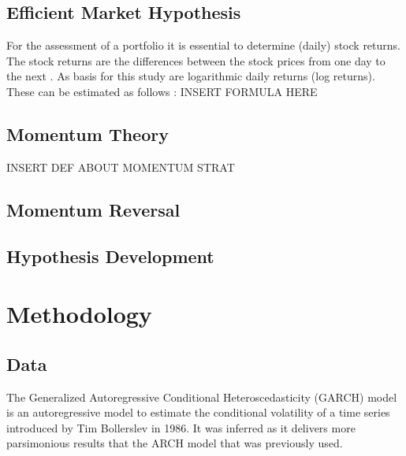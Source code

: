 \documentclass[12pt]{article}
\begin{document}
\subsection{Efficient Market Hypothesis} \label{subsection:EMH}
For the assessment of a portfolio it is essential to determine (daily) stock returns. The stock returns are the differences between the stock prices from one day to the next \parencite{Tsay2002}. As basis for this study are logarithmic daily returns (log returns). These can be estimated as follows \parencite{Tsay2002}: 
INSERT FORMULA HERE

\subsection{Momentum Theory} \label{subsection:Momentum_theory}
INSERT DEF ABOUT MOMENTUM STRAT

\subsection{Momentum Reversal} \label{subsection:Momentum_reversal}


\subsection{Hypothesis Development} \label{subsection:Hypotheses}


\section{Methodology} \label{section:Method}

\subsection{Data} \label{subsection:Data}




The Generalized Autoregressive Conditional Heteroscedasticity (GARCH) model is an autoregressive model to estimate the conditional volatility of a time series introduced by Tim Bollerslev in 1986. It was inferred as it delivers more parsimonious results that the ARCH model that was previously used. 
\end{document}
